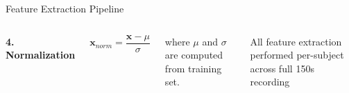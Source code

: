 \documentclass[aspectratio=169]{beamer}
\begin{document}
\begin{frame}{Feature Extraction Pipeline}
\begin{columns}[T]
\vspace{3mm}

\textbf{4. Normalization}

\begin{equation*}
\mathbf{x}_{norm} = \frac{\mathbf{x} - \mu}{\sigma}
\end{equation*}

where $\mu$ and $\sigma$ are computed from training set.

\vspace{3mm}

\begin{center}
\colorbox{accent!20}{\parbox{0.9\textwidth}{\centering\tiny
All feature extraction performed per-subject across full 150s recording
}}
\end{center}
\end{columns}
\end{frame}
\end{document}
